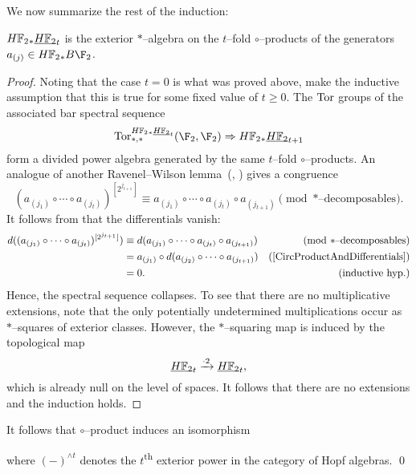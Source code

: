 We now summarize the rest of the induction:
\begin{theorem}\label{UnstableSteenrodInduction}
$\HFtwo_* \OS{\HFtwo}{t}$ is the exterior $\ast$--algebra on the $t$--fold $\circ$--products of the generators $a_{(j)} \in \HFtwo_* B\F_2$.
\end{theorem}
\begin{proof}
Noting that the case $t = 0$ is what was proved above, make the inductive assumption that this is true for some fixed value of $t \ge 0$.  The $\operatorname{Tor}$ groups of the associated bar spectral sequence \[\Tor^{\HFtwo_* \OS{\HFtwo}{t}}_{*, *}(\F_2, \F_2) \Rightarrow \HFtwo_* \OS{\HFtwo}{t+1}\] form a divided power algebra generated by the same $t$--fold $\circ$--products.  An analogue of another Ravenel--Wilson lemma~(\cite[Lemma 9.5]{RavenelWilsonKthyOfEMSpaces}, \cite[Claim 8.16]{Wilson}) gives a congruence \[(a_{(j_1)} \circ \cdots \circ a_{(j_t)})^{[2^{j_{t+1}}]} \equiv a_{(j_1)} \circ \cdots \circ a_{(j_t)} \circ a_{(j_{t+1})} \pmod{\text{$\ast$--decomposables}}.\]  It follows from  that the differentials vanish:
\begin{align*}
d((a_{(j_1)} \circ \cdots \circ a_{(j_t)})^{[2^{j_{t+1}}]}) & \equiv d(a_{(j_1)} \circ \cdots \circ a_{(j_t)} \circ a_{(j_{t+1})}) & \text{(mod $\ast$--decomposables)} \\
& = a_{(j_1)} \circ d(a_{(j_2)} \circ \cdots \circ a_{(j_{t+1})}) & \text{(\Cref{CircProductAndDifferentials})} \\
& = 0. & \text{(inductive hyp.)}
\end{align*}
Hence, the spectral sequence collapses.  To see that there are no multiplicative extensions, note that the only potentially undetermined multiplications occur as $\ast$--squares of exterior classes.  However, the $\ast$--squaring map is induced by the topological map \[\OS{\HFtwo}{t} \xrightarrow{\cdot 2} \OS{\HFtwo}{t},\] which is already null on the level of spaces.  It follows that there are no extensions and the induction holds.
\end{proof}

\begin{corollary}
It follows that $\circ$--product induces an isomorphism
\begin{center}
\end{center}
where $(-)^{\wedge t}$ denotes the $t$\textsuperscript{th} exterior power in the category of Hopf algebras. \qed
\end{corollary}

